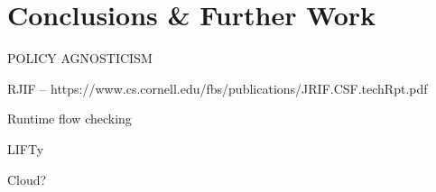 \chapter{Conclusions \& Further Work}

POLICY AGNOSTICISM

RJIF -- https://www.cs.cornell.edu/fbs/publications/JRIF.CSF.techRpt.pdf

Runtime flow checking

LIFTy \cite{polikarpova2016lifty}

Cloud?